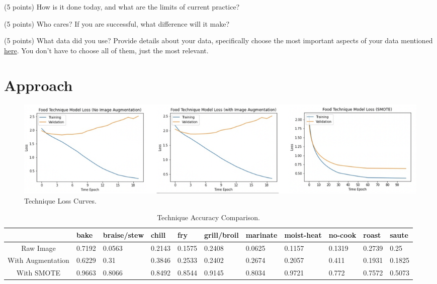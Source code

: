 \documentclass[10pt,twocolumn,letterpaper]{article}
\begin{document}
(5 points) How is it done today, and what are the limits of current practice?

(5 points) Who cares? If you are successful, what difference will it make? 

(5 points) What data did you use? Provide details about your data, specifically choose the most important aspects of your data mentioned \href{https://arxiv.org/abs/1803.09010}{here}. You don’t have to choose all of them, just the most relevant.

\section{Approach}
\begin{figure}
\begin{center}
\includegraphics[width=1.0\linewidth]{technique_model_loss_curve}
\end{center}
  \caption{Technique Loss Curves.}
\label{fig:loss_curve}
\end{figure}

\begin{table}
\begin{center}
\begin{tabular}{|c|l|l|l|l|l|l|l|l|l|l|}
\hline
 & bake & braise/stew & chill & fry & grill/broil & marinate & moist-heat & no-cook & roast & saute \\
\hline\hline
Raw Image & 0.7192 & 0.0563 & 0.2143 & 0.1575 & 0.2408 & 0.0625 & 0.1157 & 0.1319 & 0.2739 & 0.25 \\
With Augmentation & 0.6229 & 0.31 & 0.3846 & 0.2533 & 0.2402 & 0.2674 & 0.2057 & 0.411 & 0.1931 & 0.1825 \\
With SMOTE & 0.9663 & 0.8066 & 0.8492 & 0.8544 & 0.9145 & 0.8034 & 0.9721 & 0.772 & 0.7572 & 0.5073 \\
\hline
\end{tabular}
\end{center}
\caption{Technique Accuracy Comparison.}
\label{tab:accuracy}
\end{table}
\end{document}
